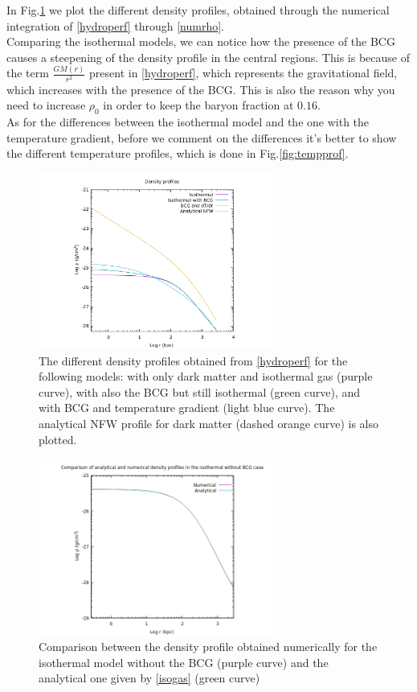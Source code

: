 \documentclass{article}
\begin{document}
In Fig.\ref{fig:densityprofiles} we plot the different density profiles, obtained through the numerical integration of \eqref{hydroperf} through \eqref{numrho}. \\
Comparing the isothermal models, we can notice how the presence of the BCG causes a steepening of the density profile in the
central regions. This is because of the term $\frac{GM(r)}{r^{2}}$ present in \eqref{hydroperf}, which represents the gravitational field, which increases with the presence of the BCG.
This is also the reason why you need to increase $\rho_{0}$ in order to keep the baryon fraction at $0.16$.\\
As for the differences between the isothermal model and the one with the temperature gradient, before we comment on the differences it's better to show the different temperature profiles, which is done in Fig.\ref{fig:tempprof}.
\begin{figure}[H]
	\centering
	\includegraphics[width=0.69\textwidth]{density.pdf}
	\caption{The different density profiles obtained from \eqref{hydroperf} for the following models: with only dark matter and isothermal gas (purple curve), with also the BCG but still isothermal (green curve), and with BCG and temperature gradient (light blue curve). 
	The analytical NFW profile for dark matter (dashed orange curve) is also plotted.}
	\label{fig:densityprofiles}
\end{figure}
\begin{figure}[H]
	\centering
	\includegraphics[width=0.69\textwidth]{rhoiso.png}
	\caption{Comparison between the density profile obtained numerically for the isothermal model without the BCG (purple curve) and the analytical one given by \eqref{isogas} (green curve)}
	\label{fig:analvsnum}
\end{figure}
\end{document}
